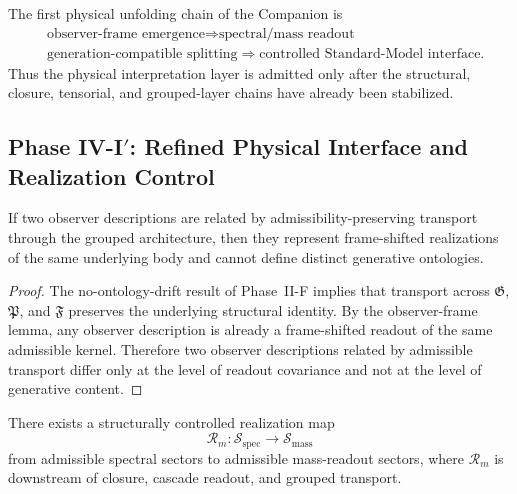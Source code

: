 \begin{corollary}
\label{cor:first-physical-unfolding-chain}
The first physical unfolding chain of the Companion is
\[
\begin{aligned}
&\text{observer-frame emergence}
  \Longrightarrow \text{spectral/mass readout}\\
&\text{generation-compatible splitting}
  \Longrightarrow \text{controlled Standard-Model interface}.
\end{aligned}
\]
Thus the physical interpretation layer is admitted only after the structural, closure, tensorial, and grouped-layer chains have already been stabilized.
\end{corollary}


\subsection*{Phase IV-I$'$: Refined Physical Interface and Realization Control}

\begin{lemma}
\label{lem:observer-covariance-admissible-transport}
If two observer descriptions are related by admissibility-preserving transport through the grouped architecture, then they represent frame-shifted realizations of the same underlying body and cannot define distinct generative ontologies.
\end{lemma}

\begin{proof}
The no-ontology-drift result of Phase~II-F implies that transport across $\mathfrak G$, $\mathfrak P$, and $\mathfrak F$ preserves the underlying structural identity. By the observer-frame lemma, any observer description is already a frame-shifted readout of the same admissible kernel. Therefore two observer descriptions related by admissible transport differ only at the level of readout covariance and not at the level of generative content.
\end{proof}

\begin{proposition}
\label{prop:spectral-to-mass-realization-map}
There exists a structurally controlled realization map
\[
\mathcal R_{m}: \mathcal S_{\mathrm{spec}} \longrightarrow \mathcal S_{\mathrm{mass}}
\]
from admissible spectral sectors to admissible mass-readout sectors, where $\mathcal R_{m}$ is downstream of closure, cascade readout, and grouped transport.
\end{proposition}

